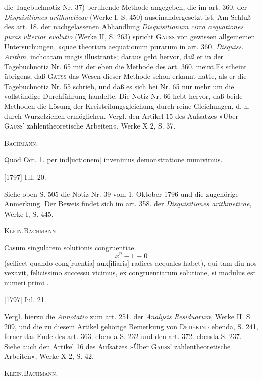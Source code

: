 \clearpage{}
\begingroup\small
\noindent die Tagebuchnotiz Nr. 37) beruhende Methode angegeben, die im art. 360. der \textit{Disquisitiones arithmeticae} (Werke I, S. 450) auseinandergesetzt ist. Am Schluß des art. 18. der nachgelassenen Abhandlung \textit{Disquisitionum circa aequationes puras ulterior evolutio} (Werke II, S. 263) spricht \textsc{Gauss} von gewissen allgemeinen Untersuchungen, »quae theoriam  aequationum purarum in art. 360. \textit{Disquiss. Arithm.} inchoatam magis illustrant«; daraus geht hervor, daß er in der Tagebuchnotiz Nr. 65 mit der  eben die Methode des art. 360. meint.\linebreak Es scheint übrigens, daß \textsc{Gauss} das Wesen dieser Methode schon erkannt hatte, als er die Tagebuchnotiz Nr. 55 schrieb, und daß es sich bei Nr. 65 nur mehr um die vollständige Durchführung handelte. Die Notiz Nr. 66 hebt hervor, daß beide Methoden die Lösung der Kreisteilungsgleichung durch reine Gleichungen, d. h. durch Wurzelziehen ermöglichen. Vergl. den Artikel 15 des Aufsatzes »Über \textsc{Gauss}' zahlentheoretische Arbeiten«, Werke X 2, S. 37.
\par\noindent\hfill\textsc{Bachmann.}
\par\endgroup

\indent Quod Oct. 1. per ind[uctionem] invenimus demonstratione munivimus.
\par\noindent\hfill[1797] Iul. 20.

\medskip\begingroup\small
\indent Siehe oben S. 505 die Notiz Nr. 39 vom 1. Oktober 1796 und die zugehörige Anmerkung. Der Beweis findet sich im art. 358. der \textit{Disquisitiones arithmeticae}, Werke I, S. 445.
\par\noindent\hfill\textsc{Klein.\quad Bachmann.}
\par\endgroup

\indent Casum singularem solutionis congruentiae
\[
x^n-1\equiv0
\]
\noindent (scilicet quando cong[ruentia] aux[iliaris] radices aequales habet), qui tam diu nos vexavit, felicissimo successu vicimus, ex congruentiarum solutione, si modulus est numeri primi .
\par\noindent\hfill[1797] Iul. 21.

\medskip\begingroup\small
\indent Vergl. hierzu die \textit{Annotatio} zum art. 251. der \textit{Analysis Residuorum}, Werke II. S. 209, und die zu diesem Artikel gehörige Bemerkung von \textsc{Dedekind} ebenda, S. 241, ferner das Ende des art. 363. ebenda S. 232 und den art. 372. ebenda S. 237. Siehe auch den Artikel 16 des Aufsatzes »Über \textsc{Gauss}' zahlentheoretische Arbeiten«, Werke X 2, S. 42.
\par\noindent\hfill\textsc{Klein.\quad Bachmann.}
\par\endgroup
